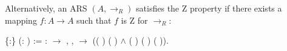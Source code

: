 \documentclass[a4paper]{article}
\begin{document}
Alternatively, an ARS $(A,\to_R)$ satisfies the Z property if there
exists a mapping $f:A \to A$ such that $f$ is Z for $\to_R$:

\begin{coqdoccode}
  \coqdocemptyline \coqdocnoindent {}
   \{:\}
  (:  ) :=
  \coqdoctac{\ensuremath{\exists}} :
  \ensuremath{\rightarrow} ,
  \coqdockw{\ensuremath{\forall}}  ,
     \ensuremath{\rightarrow}
  (( )  (
  ) \ensuremath{\land} (
  ) ( ) (
  )).\coqdoceol \coqdocemptyline
\end{coqdoccode}
\end{document}
